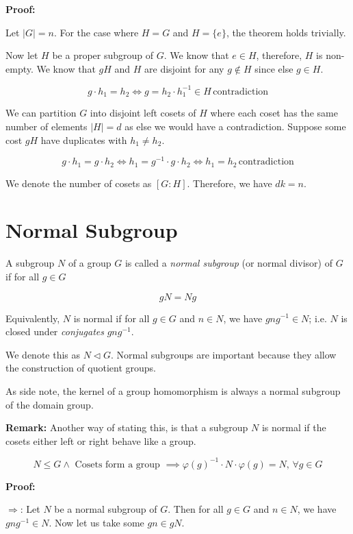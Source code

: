 \textbf{Proof:}

Let \(|G| = n\). For the case where \(H = G\) and \(H = \{e\}\), the theorem holds trivially.

Now let \(H\) be a proper subgroup of \(G\). We know that \(e \in H\), therefore, \(H\) is non-empty.
We know that \(gH\) and \(H\) are disjoint for any \(g \notin H\) since else \(g \in H\).

\[
	g \cdot h_1 = h_2 \iff g = h_2 \cdot h_1^{-1} \in H\, \text{contradiction}
\]

We can partition \(G\) into disjoint left cosets of \(H\) where each coset has the
same number of elements \(|H| = d\) as else we would have a contradiction. Suppose some
cost \(gH\) have duplicates with \(h_1 \neq h_2\).

\[
	g \cdot h_1 = g \cdot h_2 \iff h_1 = g^{-1} \cdot g \cdot h_2 \iff h_1 = h_2 \, \text{contradiction}
\]

We denote the number of cosets as \([G : H]\). Therefore, we have
\(dk = n\).

\QED

\section{Normal Subgroup}

A subgroup \(N\) of a group \(G\) is called a \emph{normal subgroup} (or normal divisor) of \(G\)
if for all \(g \in G\)

\[
	gN = Ng
\]

Equivalently, \(N\) is normal if for all \(g \in G\) and \(n \in N\), we have \(gng^{-1} \in N\); i.e.
\(N\) is closed under \emph{conjugates} \(gng^{-1}\).

We denote this as \(N \triangleleft G\). Normal subgroups are important because they allow the construction of quotient groups.

As side note, the kernel of a group homomorphism is always a normal subgroup of the domain group.

\textbf{Remark:} Another way of stating this, is that a subgroup \(N\) is normal if the cosets either left or right behave like a group.

\[
	N \leq G \land \text{ Cosets form a group } \implies  \varphi(g)^{-1} \cdot N \cdot \varphi(g) = N, \, \forall g \in G
\]

\textbf{Proof:}

\(\Rightarrow\): Let \(N\) be a normal subgroup of \(G\). Then for all \(g \in G\) and \(n \in N\), we have \(gng^{-1} \in N\).
Now let us take some \(gn \in gN\).

